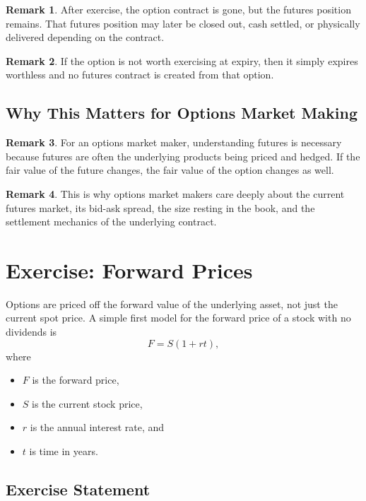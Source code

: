 \documentclass[11pt]{article}
\theoremstyle{definition}
\newtheorem{remark}{Remark}[section]
\begin{document}
\begin{remark}
After exercise, the option contract is gone, but the futures position remains. That futures position may later be closed out, cash settled, or physically delivered depending on the contract.
\end{remark}

\begin{remark}
If the option is not worth exercising at expiry, then it simply expires worthless and no futures contract is created from that option.
\end{remark}

\subsection{Why This Matters for Options Market Making}

\begin{remark}
For an options market maker, understanding futures is necessary because futures are often the underlying products being priced and hedged. If the fair value of the future changes, the fair value of the option changes as well.
\end{remark}

\begin{remark}
This is why options market makers care deeply about the current futures market, its bid-ask spread, the size resting in the book, and the settlement mechanics of the underlying contract.
\end{remark}

\section{Exercise: Forward Prices}

Options are priced off the forward value of the underlying asset, not just the current spot price. A simple first model for the forward price of a stock with no dividends is
\[
F = S(1 + rt),
\]
where
\begin{itemize}[leftmargin=2em]
    \item \(F\) is the forward price,
    \item \(S\) is the current stock price,
    \item \(r\) is the annual interest rate, and
    \item \(t\) is time in years.
\end{itemize}

\subsection{Exercise Statement}
\end{document}
